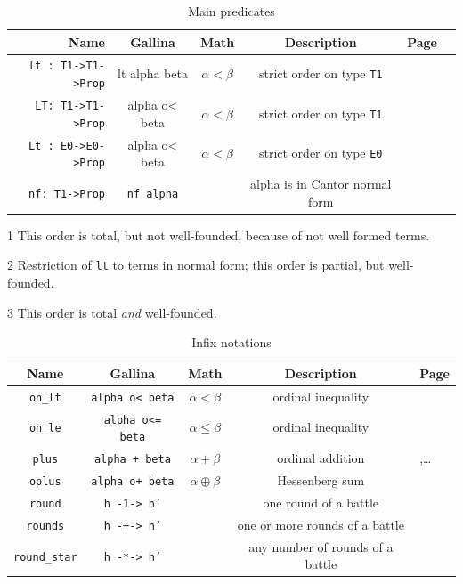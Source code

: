 \documentclass[a4paper]{book}
\begin{document}
{\begin{table}[h]
  \centering
  \begin{threeparttable}
    \caption{Main predicates}
\begin{tabular}{|r | c|c|c|c|l|}
\hline
Name & Gallina&Math& Description& Page \\\hline
\texttt{lt : T1->T1->Prop}& lt alpha beta & $\alpha < \beta$& strict order on type \texttt{T1} \tnote{1} & \pageref{Predicates:lt-T1}\\
\texttt{LT: T1->T1->Prop}& alpha o< beta & $\alpha < \beta$& strict order on type \texttt{T1}   \tnote{2} & \pageref{Predicates:LT-T1}\\
\texttt{Lt : E0->E0->Prop} & alpha o< beta & $\alpha < \beta$& strict order on type \texttt{E0} \tnote{3} & \pageref{Predicates:Lt-E0} \\
\texttt{nf: T1->Prop} & \texttt{nf alpha} && alpha is in Cantor normal form & \pageref{Predicates:nf-T1}\\
\hline
\end{tabular}
\begin{tablenotes}
  \item[1] This order is total, but not well-founded, because of not well formed terms.
\item[2] Restriction of \texttt{lt} to terms in normal form; this order is partial, but well-founded.
\item[3] This order is total \emph{and} well-founded.
\end{tablenotes}
\end{threeparttable}
\end{table}



\vspace{4pt}
\begin{table}[h]
  \centering
  \begin{threeparttable}
    \caption{Infix notations}
\begin{tabular}{|c|c|c|c|l|}
\hline
Name & Gallina&Math& Description& Page \\\hline
 \texttt{on\_lt} & \texttt{alpha o< beta}&$\alpha<\beta$& ordinal inequality \tnote{1} & \pageref{sect:on-lt-notation}\\
 \texttt{on\_le} & \texttt{alpha o<= beta}&$\alpha\leq\beta$& ordinal inequality & \pageref{sect:on-lt-notation}\\
\texttt{plus} & \texttt{alpha + beta} & $\alpha + \beta$ & ordinal addition & \pageref{sect:infix-plus-T1} ,\dots\\
\texttt{oplus} & \texttt{alpha o+ beta} & $\alpha \oplus \beta$ & Hessenberg sum & \pageref{sect:infix-oplus} \\
\texttt{round} & \texttt{h -1-> h'} & & one round of a battle & \pageref{sect:infix-round} \\
\texttt{rounds} & \texttt{h -+-> h'} & & one or more  rounds of a battle & \pageref{sect:infix-rounds} \\
\texttt{round\_star} & \texttt{h -*-> h'} & & any number of rounds of a battle & \pageref{sect:infix-rounds} \\


\end{tabular}
\end{threeparttable}
\end{table}}
\end{document}
